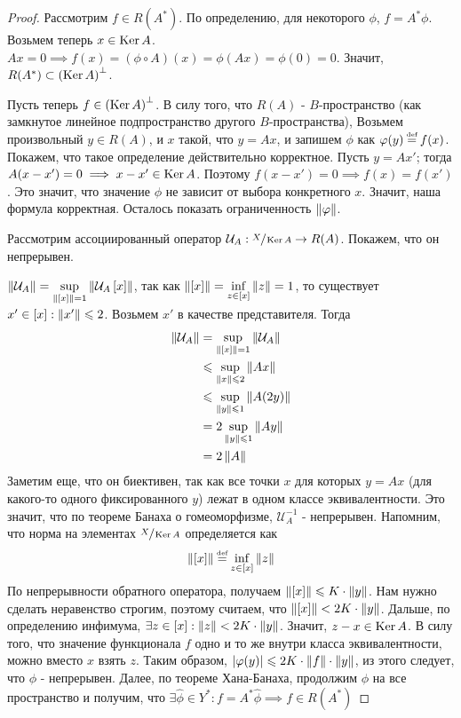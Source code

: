 \begin{proof}
	Рассмотрим $f \in R(A^*)$. По определению, для некоторого $\phi$, $f = A^*\phi$.
	Возьмем теперь $x \in \operatorname{Ker} A$. $Ax = 0 \implies f(x) = (\phi \circ A)(x) = \phi(Ax) = \phi(0) = 0$.
	Значит, $R(A^*) \subset \left( \operatorname{Ker} A\right)^\bot$.
	
	Пусть теперь $f \in \left( \operatorname{Ker} A\right)^\bot$. В силу того, что $R(A)$ - $B$-пространство 
	(как замкнутое линейное подпространство другого $B$-пространства), 
	Возьмем произвольный $y \in R(A)$, и $x$ такой, что $y = Ax$,
	и запишем $\phi$ как $\phi(y) \defeq f(x)$. Покажем, что такое определение 
	действительно корректное.
	Пусть $y = Ax'$; тогда $A(x - x') = 0 \implies x - x' \in \operatorname{Ker} A$.
	Поэтому $f(x - x') = 0 \implies f(x) = f(x')$. Это значит, что значение $\phi$ не
	зависит от выбора конкретного $x$. Значит, наша формула корректная.
	Осталось показать ограниченность $\left\|\varphi\right\|$.

	Рассмотрим ассоциированный оператор 
	$\mathcal{U}_A : \sfrac{X}{\operatorname{Ker} A} \rightarrow R(A)$.
	Покажем, что он непрерывен.    

	$\left\|\mathcal{U}_A\right\| = \sup\limits_{\left\|\left[x \right]\right\| = 1} \left\|\mathcal{U}_A\left[x \right]\right\|$,
	так как $\left\|\left[x \right]\right\| = \inf\limits_{z \in \left[x \right]} \left\|z\right\| = 1$, 
	то существует $x' \in \left[x \right] : \left\|x'\right\| \leqslant 2$.
	Возьмем $x'$ в качестве представителя. Тогда 
	\begin{equation}
		\begin{split}
			\left\|\mathcal{U}_A\right\| & = 
			\sup\limits_{\left\|\left[x \right]\right\| = 1} \left\|\mathcal{U}_A\right\| \\
			& \leqslant \sup\limits_{\left\|x\right\| \leqslant 2} \left\|Ax\right\| \\
			& \leqslant \sup\limits_{\left\|y\right\| \leqslant 1} \left\|A(2y)\right\| \\
			& = 2 \sup\limits_{\left\|y\right\| \leqslant 1} \left\|Ay\right\| \\
			& = 2 \left\|A\right\|
		\end{split}
	\end{equation}
	Заметим еще, что он биективен, так как все точки $x$ для которых $y = Ax$ 
	(для какого-то одного фиксированного
	$y$) лежат в одном классе эквивалентности. Это значит, что по теореме Банаха о гомеоморфизме, 
	$\mathcal{U}_A^{-1}$ - непрерывен. Напомним, что норма на элементах $\sfrac{X}{\operatorname{Ker} A}$
	определяется как 
	\begin{gather}
		\norm{\eqcls{x}} \defeq \inf\limits_{z \in \eqcls{x}} \norm{z}
	\end{gather}
	По непрерывности обратного оператора, получаем $\left\|\left[x \right]\right\| \leqslant K \cdot \left\|y\right\|$.
	Нам нужно сделать неравенство строгим, поэтому считаем, что 
	$\left\|\left[x \right]\right\| < 2K \cdot \left\|y\right\|$. Дальше, по определению инфимума, 
	$\exists z \in \left[x \right] : \left\|z\right\| < 2K \cdot \left\|y\right\|$. Значит, $z - x \in \operatorname{Ker} A$.
	В силу того, что значение функционала $f$ одно и то же внутри класса эквивалентности,
	можно вместо $x$ взять $z$. Таким образом, 
	$\left|\varphi(y)\right| \leqslant 2K \cdot \left\|f\right\| \cdot \left\|y\right\|$, из этого следует, что 
	$\phi$ - непрерывен. 
	Далее, по теореме Хана-Банаха, продолжим $\phi$ на все пространство и получим, что 
	$\exists \widehat{\phi} \in Y^* : f = A^*\widehat{\phi} \implies f \in R(A^*)$
		
\end{proof}


